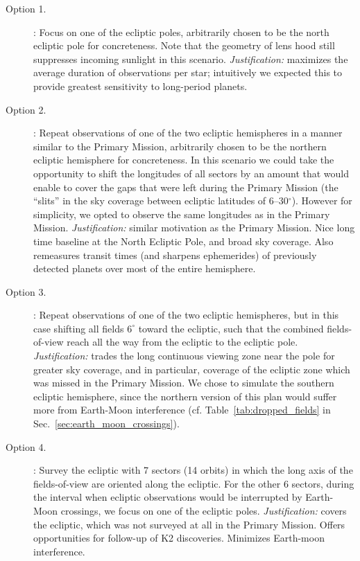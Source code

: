\begin{description}

\item[Option 1.] \npole: Focus on one of the ecliptic poles,
  arbitrarily chosen to be the north ecliptic pole for
  concreteness. Note that the geometry of \tesss lens hood still
  suppresses incoming sunlight in this scenario.
  \textit{Justification:} maximizes the average duration of
  observations per star; intuitively we expected this to provide
  greatest sensitivity to long-period planets.

\item[Option 2.] \nhemi: Repeat observations of one of the two
  ecliptic hemispheres in a manner similar to the Primary Mission,
  arbitrarily chosen to be the northern ecliptic hemisphere for
  concreteness. In this scenario we could take the opportunity to 
  shift the longitudes of all sectors by an amount that would enable 
  \tess to cover the gaps that were left during the Primary Mission 
  (the ``slits'' in the sky coverage between ecliptic latitudes of 
  6--30$^\circ$).
  However for simplicity, we opted to observe the same longitudes as
  in the Primary Mission.
  \textit{Justification:} similar motivation as the Primary Mission.
  Nice long time baseline at the North Ecliptic Pole, and broad sky
  coverage. Also remeasures transit times (and sharpens ephemerides)
  of previously detected \tess planets over most of the entire
  hemisphere.

\item[Option 3.] \shemiAvoid: Repeat observations of one of the two
  ecliptic hemispheres, but in this case shifting all fields $6^\circ$
  toward the ecliptic, such that the combined fields-of-view reach all
  the way from the ecliptic to the ecliptic pole.
  \textit{Justification:} trades the long continuous viewing zone near
  the pole for greater sky coverage, and in particular, coverage of
  the ecliptic zone which was missed in the Primary Mission.  We chose
  to simulate the southern ecliptic hemisphere, since the northern
  version of this plan would suffer more from Earth-Moon interference
  (cf. Table~\ref{tab:dropped_fields} in
  Sec.~\ref{sec:earth_moon_crossings}).
  
\item[Option 4.] \elong: Survey the ecliptic with 7 sectors (14
  orbits) in which the long axis of the fields-of-view are oriented
  along the ecliptic.  For the other 6 sectors, during the interval
  when ecliptic observations would be interrupted by Earth-Moon
  crossings, we focus on one of the ecliptic poles.
  \textit{Justification:} covers the ecliptic, which was not surveyed
  at all in the Primary Mission.  Offers opportunities for follow-up
  of K2 discoveries. Minimizes Earth-moon interference.
  

\end{description}
